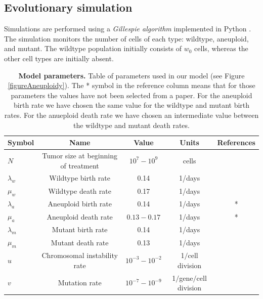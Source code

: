 \documentclass[12pt]{extarticle}
\begin{document}
\subsection*{Evolutionary simulation} 
Simulations are performed using a \emph{Gillespie algorithm} \cite{gillespie1976general,gillespie1977exact} implemented in Python \cite{python}.
The simulation monitors the number of cells of each type: wildtype, aneuploid, and mutant. 
The wildtype population initially consists of $w_0$ cells, whereas the other cell types are initially absent.
\begin{table}
\begin{center}
  \begin{tabular}{| l |c| c | c | c |}
    \hline
    Symbol & Name & Value & Units & References \\ \hline
    $N$ & Tumor size at beginning of treatment& $10^7-10^9$ & cells  & \cite{del2009does} \\ \hline
    $\lambda_w$ & Wildtype birth rate& 0.14 & 1/days  & \cite{bozic2013evolutionary} \\ \hline
    $\mu_w$ & Wildtype death rate& 0.17 & 1/days  & \cite{bozic2013evolutionary} \\ \hline
    $\lambda_a$ & Aneuploid birth rate& 0.14 & 1/days  & * \\ \hline
    $\mu_a$ & Aneuploid death rate& $0.13-0.17$ & 1/days  & * \\ \hline
    $\lambda_m$ & Mutant birth rate& 0.14 & 1/days  & \cite{bozic2013evolutionary} \\ \hline
    $\mu_m$ & Mutant death rate& 0.13 & 1/days  & \cite{bozic2013evolutionary} \\ \hline
    $u$ & Chromosomal instability rate& $10^{-3}-10^{-2}$ & 1$\slash$cell division  & \cite{nowak2004evolutionary,bakker2023predicting} \\ \hline
    $v$ & Mutation rate& $10^{-7}-10^{-9}$ &  1$\slash$gene$\slash$cell division  & \cite{nowak2004evolutionary} \\ \hline
  \end{tabular}
\caption{\label{demo-table}\textbf{Model parameters.} Table of parameters used in our model (see Figure \ref{figureAneuploidy}). The * symbol in the reference column means that for those parameters the values have not been selected from a paper. For the aneuploid birth rate we have chosen the same value for the wildtype and mutant birth rates. For the anueploid death rate we have chosen an intermediate value between the wildtype and mutant death rates.}
  \label{table1}
\end{center}
\end{table}
\end{document}
